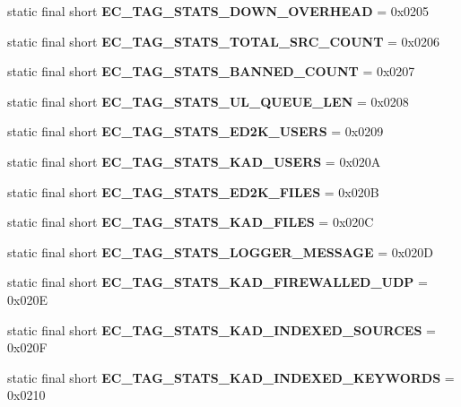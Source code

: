 \begin{DoxyCompactItemize}
\item 
static final short {\bfseries EC\_\-TAG\_\-STATS\_\-DOWN\_\-OVERHEAD} = 0x0205\label{interfaceECCodes_ad28ac5e9dd5112eddf25bede8704e285}

\item 
static final short {\bfseries EC\_\-TAG\_\-STATS\_\-TOTAL\_\-SRC\_\-COUNT} = 0x0206\label{interfaceECCodes_a48747c68ae67d85ad41a7a2fc0715566}

\item 
static final short {\bfseries EC\_\-TAG\_\-STATS\_\-BANNED\_\-COUNT} = 0x0207\label{interfaceECCodes_ab2260fb3c2edc8c0676c8e247a2128f8}

\item 
static final short {\bfseries EC\_\-TAG\_\-STATS\_\-UL\_\-QUEUE\_\-LEN} = 0x0208\label{interfaceECCodes_a9dae60cf72343c06995fc1e94584a857}

\item 
static final short {\bfseries EC\_\-TAG\_\-STATS\_\-ED2K\_\-USERS} = 0x0209\label{interfaceECCodes_a50377cdcfd4b6282fb69bc2503c49f35}

\item 
static final short {\bfseries EC\_\-TAG\_\-STATS\_\-KAD\_\-USERS} = 0x020A\label{interfaceECCodes_ab5ce97c038e34c3940eb40881b485820}

\item 
static final short {\bfseries EC\_\-TAG\_\-STATS\_\-ED2K\_\-FILES} = 0x020B\label{interfaceECCodes_acebc44203410cee2d0a2235086561ad4}

\item 
static final short {\bfseries EC\_\-TAG\_\-STATS\_\-KAD\_\-FILES} = 0x020C\label{interfaceECCodes_af899fbc458f0cd243d095dd8e4b65e8d}

\item 
static final short {\bfseries EC\_\-TAG\_\-STATS\_\-LOGGER\_\-MESSAGE} = 0x020D\label{interfaceECCodes_a7708ad7817a93e49983c43f00a08b2d6}

\item 
static final short {\bfseries EC\_\-TAG\_\-STATS\_\-KAD\_\-FIREWALLED\_\-UDP} = 0x020E\label{interfaceECCodes_adf2f2088919163791f9f2db936a7b579}

\item 
static final short {\bfseries EC\_\-TAG\_\-STATS\_\-KAD\_\-INDEXED\_\-SOURCES} = 0x020F\label{interfaceECCodes_a226d2a1c7669db3ea09a93030c3a79d5}

\item 
static final short {\bfseries EC\_\-TAG\_\-STATS\_\-KAD\_\-INDEXED\_\-KEYWORDS} = 0x0210\label{interfaceECCodes_acd7ba277a4210c50bd69961cb42ab125}


\end{DoxyCompactItemize}
